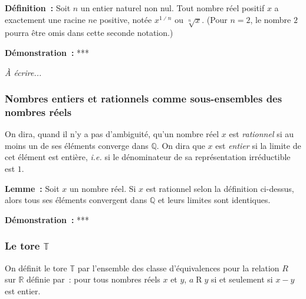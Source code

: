 \medskip

\noindent\textbf{Définition :} Soit $n$ un entier naturel non nul. 
    Tout nombre réel positif $x$ a exactement une racine $n$e positive, notée $x^{1 \divslash n}$ ou $\sqrt[n]{x}$.
    (Pour $n = 2$, le nombre $2$ pourra être omis dans cette seconde notation.)

\medskip

\noindent\textbf{Démonstration :} ***

\medskip

\emph{À écrire...}

\subsubsection{Nombres entiers et rationnels comme sous-ensembles des nombres réels}
 
 

On dira, quand il n'y a pas d'ambiguité, qu'un nombre réel $x$ est \emph{rationnel} si au moins un de ses éléments converge dans $\mathbb{Q}$.
On dira que $x$ est \emph{entier} si la limite de cet élément est entière, \emph{i.e.} si le dénominateur de sa représentation irréductible est $1$.

\medskip

\noindent\textbf{Lemme :} Soit $x$ un nombre réel. Si $x$ est rationnel selon la définition ci-dessus, alors tous ses éléments convergent dans $\mathbb{Q}$ et leurs limites sont identiques.

\medskip

\noindent\textbf{Démonstration :} ***

\subsubsection{Le tore \texorpdfstring{$\mathbb{T}$}{T}}

On définit le tore $\mathbb{T}$ par l'ensemble des classe d'équivalences pour la relation $R$ sur $\mathbb{R}$ définie par : pour tous nombres réels $x$ et $y$, $a \mathrel{R} y$ si et seulement si $x - y$ est entier. 

\medskip

